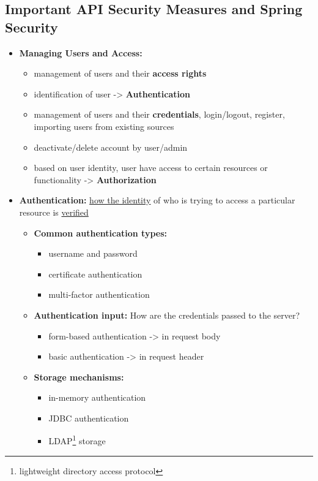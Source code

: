 \documentclass[ieeetran]{article}
\begin{document}
\subsection{Important API Security Measures and Spring Security} %
\label{sub:important_aPI_security_measures_and_spring_security}
\begin{itemize}
	\item \textbf{Managing Users and Access:}
		\begin{itemize}
		  \item management of users and their \textbf{access rights}
		\item identification of user -> \textbf{Authentication}
		\item management of users and their \textbf{credentials}, login/logout, register, importing users from existing sources
		\item deactivate/delete account by user/admin
		\item based on user identity, user have access to certain resources or functionality -> \textbf{Authorization}
		\end{itemize}

\item \textbf{Authentication:} \underline{how the identity} of who is trying to access a particular resource is \underline{verified}

	\begin{itemize}
		\item \textbf{Common authentication types:}
	\begin{itemize}
		\item username and password
		\item certificate authentication
		\item multi-factor authentication	
	\end{itemize}

	\item \textbf{Authentication input:} How are the credentials passed to the server?
		\begin{itemize}
		  \item form-based authentication -> in request body
		\item basic authentication -> in request header
		\end{itemize}

\item \textbf{Storage mechanisms:}
	\begin{itemize}
	  \item in-memory authentication
	\item JDBC authentication
	\item LDAP\footnote{lightweight directory access protocol} storage
	\end{itemize}
	\end{itemize}


\end{itemize}
\end{document}
